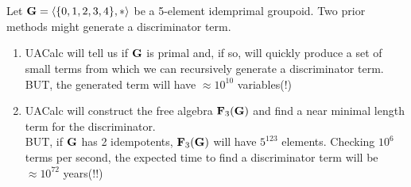 \documentclass{beamer}
\newcommand{\G}{{\rm{\textbf{G}}}}
\begin{document}









\section[Prior Methods]{}

\begin{frame}
Let $\G = \langle\{0,1,2,3,4\},*\rangle$ be a 5-element idemprimal groupoid.
Two prior methods might generate a discriminator term.
\pause
\begin{enumerate}
   \item UACalc will tell us if $\G$ is primal and, if so, will quickly produce a set of small terms from which we can recursively generate a discriminator term. \\  \pause
    BUT, the generated term will have $\approx 10^{10}$ variables(!)  \pause
   \item UACalc will construct the free algebra $\mathbf{F}_3(\G)$ and find a near minimal length term for the discriminator. \\   \pause
    BUT, if $\G$ has 2 idempotents, $\mathbf{F}_3(\G)$ will have $5^{123}$  elements. \pause 
Checking $10^6$ terms per second, the expected time to find a discriminator term will be $\approx 10^{72}$ years(!!)
 \end{enumerate}
\end{frame}
\end{document}
